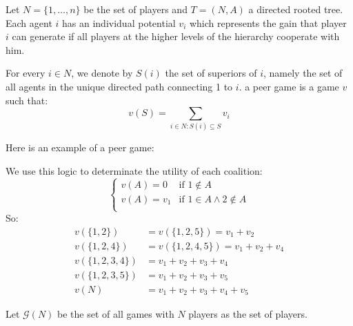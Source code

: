 \documentclass[../main.tex]{subfiles}
\begin{document}
\begin{definition}
    Let $N = \{1,\ldots,n\}$ be the set of players and $T = (N,A)$ a directed rooted tree. Each agent $i$ has an individual potential $v_i$ which represents the gain that player $i$ can generate if all players at the higher levels of the hierarchy cooperate with him.

    For every $i \in N$, we denote by $S(i)$ the set of superiors of $i$, namely the set of all agents in the unique directed path connecting 1 to $i$. a peer game is a game $v$ such that:
    \[
        v(S) = \sum_{i \in N : S(i) \subseteq S} v_i
    \]
\end{definition}
\begin{example} Here is an example of a peer game:
    \begin{center}
    \end{center}
    We use this logic to determinate the utility of each coalition:
    \[
        \begin{cases}
            v(A) = 0   & \text{if } 1 \notin A               \\
            v(A) = v_1 & \text{if } 1 \in A \land 2 \notin A \\
        \end{cases}
    \]
    So:
    \begin{align*}
        v(\{1, 2\})       & = v(\{1, 2, 5\}) = v_1 + v_2          \\
        v(\{1, 2, 4\})    & = v(\{1, 2, 4, 5\}) = v_1 + v_2 + v_4 \\
        v(\{1, 2, 3, 4\}) & = v_1 + v_2 + v_3 + v_4               \\
        v(\{1, 2, 3, 5\}) & = v_1 + v_2 + v_3 + v_5               \\
        v(N)              & = v_1 + v_2 + v_3 + v_4 + v_5
    \end{align*}
\end{example}

Let $\mathcal{G}(N)$ be the set of all games with $N$ players as the set of players.
\end{document}
